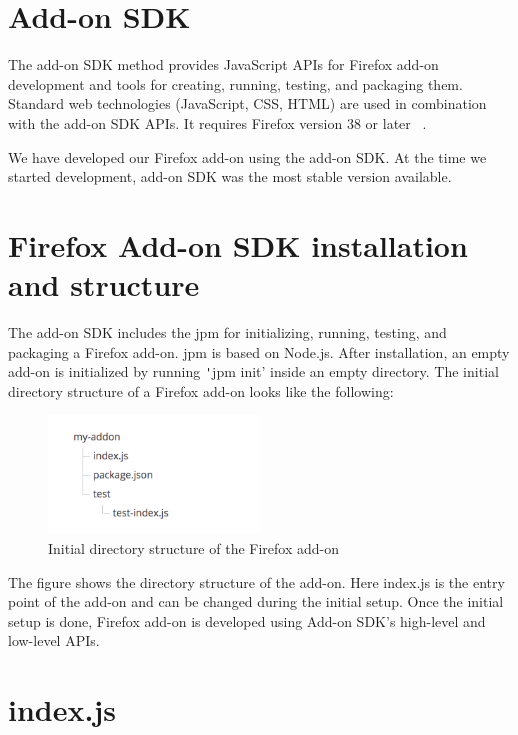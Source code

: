 \section{Add-on SDK}

The add-on SDK method provides JavaScript APIs for Firefox add-on development and tools for creating, running, testing, and packaging them. Standard web technologies (JavaScript, CSS, HTML) are used in combination with the add-on SDK APIs.
It requires Firefox version 38 or later ~\cite{g18}. 

We have developed our Firefox add-on using the add-on SDK. At the time we started development, add-on SDK was the most stable version available.

\section{Firefox Add-on SDK installation and structure}

The add-on SDK includes the jpm for initializing, running, testing, and packaging a Firefox add-on. jpm is based on Node.js. After installation, an empty add-on is initialized by running \texttt 'jpm init' inside an empty directory. The initial directory structure of a Firefox add-on looks like the following:

\begin{figure}[htb]
\centering
\includegraphics[width=0.5\textwidth]{image/initial_dir_struct.png}
\caption[Initial directory structure of the Firefox add-on]{Initial directory structure of the Firefox add-on ~\cite{g18}} 
\label{fig:initial_dir_struct}
\end{figure}

The figure shows the directory structure of the add-on. Here index.js is the entry point of the add-on and can be changed during the initial setup. Once the initial setup is done, Firefox add-on is developed using Add-on SDK's high-level and low-level APIs.

\section{index.js}

